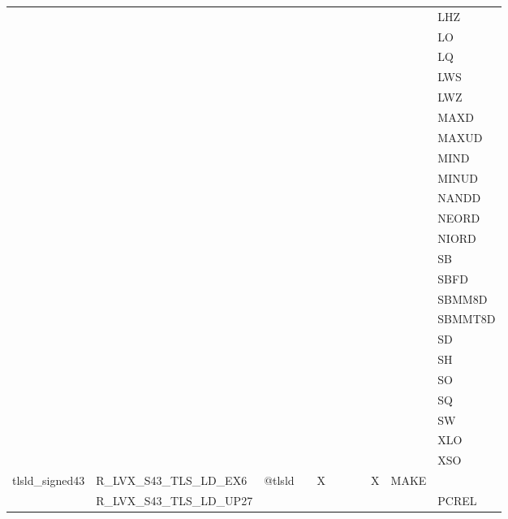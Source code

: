 {\begin{tabular}{|l|l|l|l|l|l|l|l|l|l|l|}
 & & & & & & & & & & \textsf{LHZ} \\
 & & & & & & & & & & \textsf{LO} \\
 & & & & & & & & & & \textsf{LQ} \\
 & & & & & & & & & & \textsf{LWS} \\
 & & & & & & & & & & \textsf{LWZ} \\
 & & & & & & & & & & \textsf{MAXD} \\
 & & & & & & & & & & \textsf{MAXUD} \\
 & & & & & & & & & & \textsf{MIND} \\
 & & & & & & & & & & \textsf{MINUD} \\
 & & & & & & & & & & \textsf{NANDD} \\
 & & & & & & & & & & \textsf{NEORD} \\
 & & & & & & & & & & \textsf{NIORD} \\
 & & & & & & & & & & \textsf{SB} \\
 & & & & & & & & & & \textsf{SBFD} \\
 & & & & & & & & & & \textsf{SBMM8D} \\
 & & & & & & & & & & \textsf{SBMMT8D} \\
 & & & & & & & & & & \textsf{SD} \\
 & & & & & & & & & & \textsf{SH} \\
 & & & & & & & & & & \textsf{SO} \\
 & & & & & & & & & & \textsf{SQ} \\
 & & & & & & & & & & \textsf{SW} \\
 & & & & & & & & & & \textsf{XLO} \\
 & & & & & & & & & & \textsf{XSO} \\
\hline
\textsf{tlsld\_signed43} & \textsf{R\_LVX\_S43\_TLS\_LD\_EX6} & \textsf{@tlsld} & \textsf{} & \textsf{X} & \textsf{} & \textsf{} & \textsf{} & \textsf{X} & \textsf{MAKE} \\
 & \textsf{R\_LVX\_S43\_TLS\_LD\_UP27} & & & & & & & & & \textsf{PCREL} \\
\hline\end{tabular}
}
\smallskip

